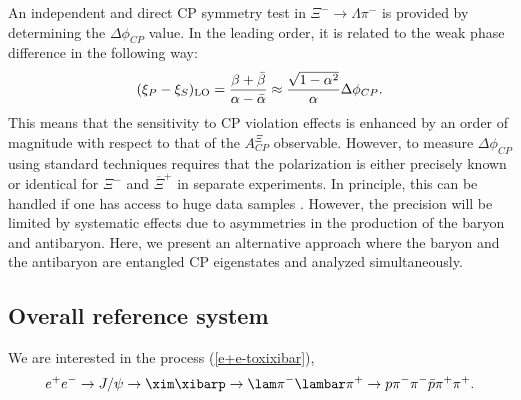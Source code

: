 An independent and direct CP symmetry test in $\Xi^-\to\Lambda\pi^-$ is provided by determining the  $\Delta \phi_{CP}$ value. In the leading order, it is related to the weak phase difference in the following way:
\begin{equation}
 (\xi_P - \xi_S)_{\rm{LO}} = \frac{\beta + \bar{\beta}}{\alpha - \bar{\alpha}}\approx \frac{\sqrt{1-\alpha^2}}{\alpha}\Delta \phi_{CP}.  
 \label{eq:betaprime}
\end{equation} 
This means that the sensitivity to CP violation effects is enhanced by an order of magnitude with respect to that of the $A_{CP}^{\Xi}$ observable\cite{JD85, JD86}. However, to measure 
$\Delta \phi_{CP}$ using standard techniques requires that the polarization is either precisely known or identical for $\Xi^-$ and $\overline{\Xi}^+$ in separate experiments.  In principle, this can be handled if one has access to huge data samples \cite{MS08}. However, the precision will be limited by systematic effects due to asymmetries in the production of the baryon and antibaryon. Here, we present an alternative approach where the baryon and the antibaryon are entangled CP eigenstates and analyzed simultaneously.

\subsection{Overall reference system}
\noindent We are interested in the process (\ref{e+e-toxixibar}), 
\begin{equation}
    e^{+}e^{-}\to J/\psi\rightarrow \xim\xibarp\to\lam\pi^{-}\lambar\pi^{+}\to p\pi^{-}\pi^{-}\bar{p}\pi^{+}\pi^{+}.
\end{equation}




